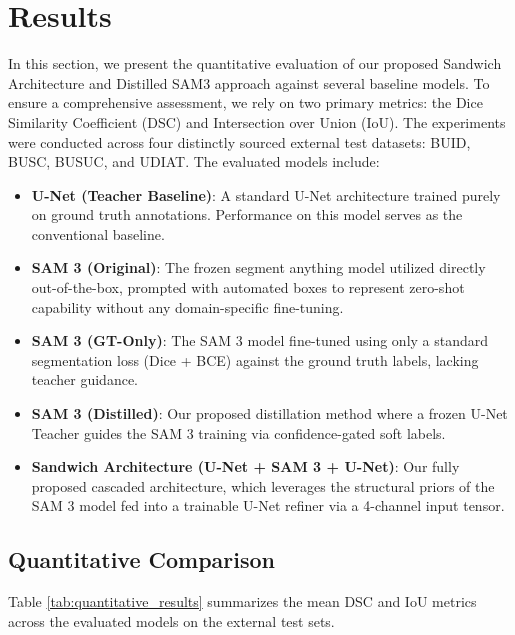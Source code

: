 \section{Results}
\label{sec:results}

In this section, we present the quantitative evaluation of our proposed Sandwich Architecture and Distilled SAM3 approach against several baseline models. To ensure a comprehensive assessment, we rely on two primary metrics: the Dice Similarity Coefficient (DSC) and Intersection over Union (IoU). The experiments were conducted across four distinctly sourced external test datasets: BUID, BUSC, BUSUC, and UDIAT. The evaluated models include: 

\begin{itemize}
    \item \textbf{U-Net (Teacher Baseline)}: A standard U-Net architecture trained purely on ground truth annotations. Performance on this model serves as the conventional baseline.
    \item \textbf{SAM 3 (Original)}: The frozen segment anything model utilized directly out-of-the-box, prompted with automated boxes to represent zero-shot capability without any domain-specific fine-tuning.
    \item \textbf{SAM 3 (GT-Only)}: The SAM 3 model fine-tuned using only a standard segmentation loss (Dice + BCE) against the ground truth labels, lacking teacher guidance.
    \item \textbf{SAM 3 (Distilled)}: Our proposed distillation method where a frozen U-Net Teacher guides the SAM 3 training via confidence-gated soft labels.
    \item \textbf{Sandwich Architecture (U-Net + SAM 3 + U-Net)}: Our fully proposed cascaded architecture, which leverages the structural priors of the SAM 3 model fed into a trainable U-Net refiner via a 4-channel input tensor.
\end{itemize}

\subsection{Quantitative Comparison}

Table \ref{tab:quantitative_results} summarizes the mean DSC and IoU metrics across the evaluated models on the external test sets. 

